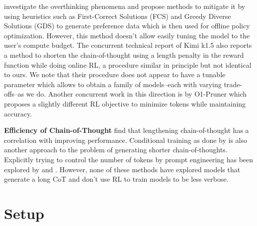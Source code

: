 \citet{chen2024think23overthinkingo1like} investigate the overthinking phenomena and propose methods to mitigate it by using heuristics such as First-Correct Solutions (FCS) and Greedy Diverse Solutions (GDS) to generate preference data which is then used for offline policy optimization. However, this method doesn't allow easily tuning the model to the user's compute budget. 
The concurrent technical report of Kimi k1.5 \cite{kimiteam2025kimik15scalingreinforcement} also reports a method to shorten the chain-of-thought using a length penalty in the reward function while doing online RL, a procedure similar in principle but not identical to ours.
We note that their procedure does not appear to have a tunable parameter which allows to obtain a family of models--each with varying trade-offs--as we do. Another concurrent work in this direction is by O1-Pruner \cite{luo2025o1prunerlengthharmonizingfinetuningo1like} which proposes a slightly different RL objective to minimize tokens while maintaining accuracy. 

\textbf{Efficiency of Chain-of-Thought} \citet{jin-etal-2024-impact} find that lengthening chain-of-thought has a correlation with improving performance. Conditional training as done by \citet{kang2024c3otgeneratingshorterchainofthought} is also another approach to the problem of generating shorter chain-of-thoughts. Explicitly trying to control the number of tokens by prompt engineering has been explored by \citet{nayab2025concisethoughtsimpactoutput} and \citet{han2024tokenbudgetawarellmreasoning}. However, none of these methods have explored models that generate a long CoT and don't use RL to train models to be less verbose. 


\section{Setup}
\label{sec:setup}

\def\p{\ensuremath{p}}
\def\x{\ensuremath{x}}
\def\y{\ensuremath{y}}
\def\cot{\ensuremath{c}}
\def\answer{\ensuremath{y}}
\def\t{\ensuremath{t}}
\def\reward{\ensuremath{r}}
\def\dist{\ensuremath{\rho}}
\def\E{\mathbb E}
\def\f{\ensuremath{f}}
\def\rshape{g}
\def\len{\textsc{len}}
\def\1{{1}}
\def\goldanswer{\answer^\star}
\def\coeff{\alpha}
\def\std{\textsc{std}}
\def\mean{\textsc{mean}}
\def\accuracy{\textsc{Accuracy}}

